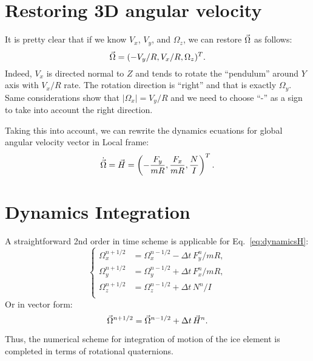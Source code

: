 
\section{Restoring 3D angular velocity}

It is pretty clear that if we know $V_x$, $V_y$, and $\Omega_z$, we
can restore ${\vec{\Omega}}$ as follows: 
\begin{equation}
  {\vec{\Omega}}= (-V_y/R, V_x/R, \Omega_z)^T.
\end{equation}
Indeed, $V_x$ is directed normal to $Z$ and tends to rotate the
``pendulum'' around $Y$ axis with $V_x/R$ rate. The rotation
direction is ``right'' and that is exactly $\Omega_y$. Same
considerations show that $|\Omega_x| = V_y/R$ and we need to choose
``-'' as a sign to take into account the right direction.

Taking this into account, we can rewrite the dynamics ecuations for
global angular velocity vector in Local frame:
\begin{equation}\label{eq:dynamicsH}
  \dot{{\vec{\Omega}}} = {\vec{H}} = \left( -\frac{F_y}{mR}, \frac{F_x}{mR},
  \frac{N}{I} \right)^T.
\end{equation}


\section{Dynamics Integration}

A straightforward 2nd order in time scheme is applicable for
Eq.~\eqref{eq:dynamicsH}:
\begin{equation}
  \left\{
  \begin{aligned}
  \Omega_x^{n+1/2} &= \Omega_x^{n-1/2} - \Delta t\,F_y^n/mR,\\
  \Omega_y^{n+1/2} &= \Omega_y^{n-1/2} + \Delta t\,F_x^n/mR,\\
  \Omega_z^{n+1/2} &= \Omega_z^{n-1/2} + \Delta t\,N^n/I\\
  \end{aligned}
  \right.
\end{equation}
Or in vector form:
\begin{equation}
  {\vec{\Omega}}^{n+1/2} = {\vec{\Omega}}^{n-1/2} + \Delta t\,{\vec{H}}^n.
\end{equation}


Thus, the numerical scheme for integration of motion of the ice
element is completed in terms of rotational quaternions.

